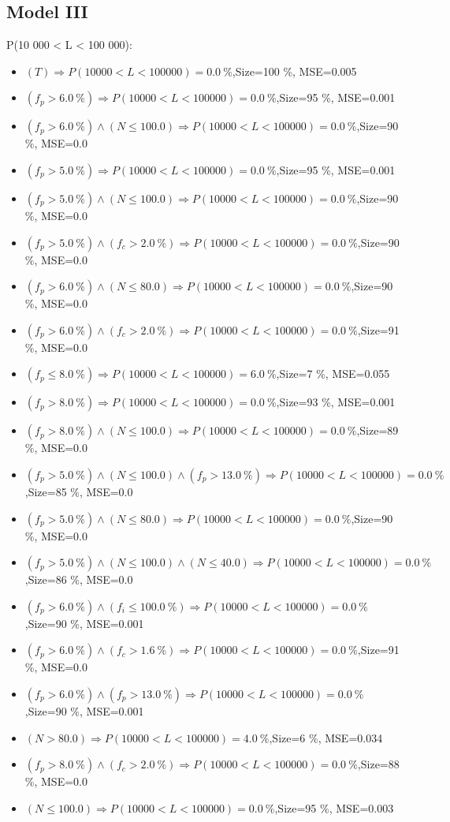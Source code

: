 \documentclass[numbered]{CSL}
\begin{document}
\subsection{Model III}
P(10 000 < L < 100 000):
\begin{itemize}
\item $(T) \Rightarrow P(10 000 < L < 100 000) = 0.0~\%$,\hfill Size=100 \%, MSE=0.005
\item $(f_p > 6.0~\%) \Rightarrow P(10 000 < L < 100 000) = 0.0~\%$,\hfill Size=95 \%, MSE=0.001
\item $(f_p > 6.0~\%) \land (N \leq 100.0) \Rightarrow P(10 000 < L < 100 000) = 0.0~\%$,\hfill Size=90 \%, MSE=0.0
\item $(f_p > 5.0~\%) \Rightarrow P(10 000 < L < 100 000) = 0.0~\%$,\hfill Size=95 \%, MSE=0.001
\item $(f_p > 5.0~\%) \land (N \leq 100.0) \Rightarrow P(10 000 < L < 100 000) = 0.0~\%$,\hfill Size=90 \%, MSE=0.0
\item $(f_p > 5.0~\%) \land (f_c > 2.0~\%) \Rightarrow P(10 000 < L < 100 000) = 0.0~\%$,\hfill Size=90 \%, MSE=0.0
\item $(f_p > 6.0~\%) \land (N \leq 80.0) \Rightarrow P(10 000 < L < 100 000) = 0.0~\%$,\hfill Size=90 \%, MSE=0.0
\item $(f_p > 6.0~\%) \land (f_c > 2.0~\%) \Rightarrow P(10 000 < L < 100 000) = 0.0~\%$,\hfill Size=91 \%, MSE=0.0
\item $(f_p \leq 8.0~\%) \Rightarrow P(10 000 < L < 100 000) = 6.0~\%$,\hfill Size=7 \%, MSE=0.055
\item $(f_p > 8.0~\%) \Rightarrow P(10 000 < L < 100 000) = 0.0~\%$,\hfill Size=93 \%, MSE=0.001
\item $(f_p > 8.0~\%) \land (N \leq 100.0) \Rightarrow P(10 000 < L < 100 000) = 0.0~\%$,\hfill Size=89 \%, MSE=0.0
\item $(f_p > 5.0~\%) \land (N \leq 100.0) \land (f_p > 13.0~\%) \Rightarrow P(10 000 < L < 100 000) = 0.0~\%$,\hfill Size=85 \%, MSE=0.0
\item $(f_p > 5.0~\%) \land (N \leq 80.0) \Rightarrow P(10 000 < L < 100 000) = 0.0~\%$,\hfill Size=90 \%, MSE=0.0
\item $(f_p > 5.0~\%) \land (N \leq 100.0) \land (N \leq 40.0) \Rightarrow P(10 000 < L < 100 000) = 0.0~\%$,\hfill Size=86 \%, MSE=0.0
\item $(f_p > 6.0~\%) \land (f_i \leq 100.0~\%) \Rightarrow P(10 000 < L < 100 000) = 0.0~\%$,\hfill Size=90 \%, MSE=0.001
\item $(f_p > 6.0~\%) \land (f_c > 1.6~\%) \Rightarrow P(10 000 < L < 100 000) = 0.0~\%$,\hfill Size=91 \%, MSE=0.0
\item $(f_p > 6.0~\%) \land (f_p > 13.0~\%) \Rightarrow P(10 000 < L < 100 000) = 0.0~\%$,\hfill Size=90 \%, MSE=0.001
\item $(N > 80.0) \Rightarrow P(10 000 < L < 100 000) = 4.0~\%$,\hfill Size=6 \%, MSE=0.034
\item $(f_p > 8.0~\%) \land (f_c > 2.0~\%) \Rightarrow P(10 000 < L < 100 000) = 0.0~\%$,\hfill Size=88 \%, MSE=0.0
\item $(N \leq 100.0) \Rightarrow P(10 000 < L < 100 000) = 0.0~\%$,\hfill Size=95 \%, MSE=0.003
\end{itemize}
\end{document}
